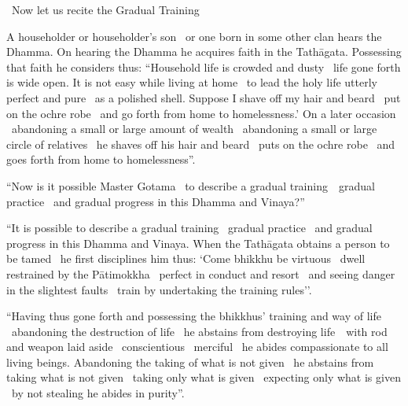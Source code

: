 \begin{leader-english}
  \anglebracketleft\ \hspace{-0.5mm}Now let us recite the Gradual Training \hspace{-0.5mm}\anglebracketright\
\end{leader-english}
\begin{english-only-justify}
  A householder or householder's son \breathmark\ or one born in some other clan hears the Dhamma. On hearing the Dhamma he acquires faith in the Tathāgata. Possessing that faith he considers thus: ``Household life is crowded and dusty \breathmark\ life gone forth is wide open. It is not easy while living at home \breathmark\ to lead the holy life utterly perfect and pure \breathmark\ as a polished shell. Suppose I shave off my hair and beard \breathmark\ put on the ochre robe \breathmark\ and go forth from home to homelessness.' On a later occasion \breathmark\ abandoning a small or large amount of wealth \breathmark\ abandoning a small or large circle of relatives \breathmark\ he shaves off his hair and beard \breathmark\ puts on the ochre robe \breathmark\ and goes forth from home to homelessness''.
\end{english-only-justify}

\suttaRef{[MN 27 / 38 / 51]}

\begin{english-only-justify}
  ``Now is it possible Master Gotama \breathmark\ to describe a gradual \mbox{training}~\breathmark\ gradual practice \breathmark\ and gradual progress in this Dhamma and Vinaya?''
\end{english-only-justify}

\begin{english-only-justify}
  ``It is possible to describe a gradual training \breathmark\ gradual practice \breathmark\ and gradual progress in this Dhamma and Vinaya. When the Tathāgata obtains a person to be tamed \breathmark\ he first disciplines him thus: `Come bhikkhu be virtuous \breathmark\ dwell restrained by the Pātimokkha \breathmark\ perfect in conduct and resort \breathmark\ and seeing danger in the slightest faults \breathmark\ train by undertaking the training rules''.
\end{english-only-justify}

\suttaRef{[MN 107]}

\begin{english-only-justify}
  ``Having thus gone forth and possessing the bhikkhus' training and way of life \breathmark\ abandoning the destruction of life \breathmark\ he abstains from destroying \mbox{life}~\breathmark\ with rod and weapon laid aside \breathmark\ conscientious \breathmark\ merciful \breathmark\ he abides compassionate to all living beings. Abandoning the taking of what is not given \breathmark\ he abstains from taking what is not given \breathmark\ taking only what is given \breathmark\ expecting only what is given \breathmark\ by not stealing he abides in purity''.
\end{english-only-justify}

